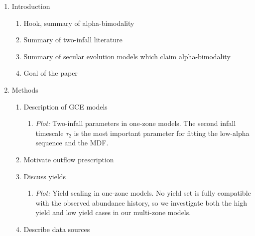 \begin{enumerate}

    \item Introduction
    \begin{enumerate}
        \item Hook, summary of alpha-bimodality
        \item Summary of two-infall literature
        \item Summary of secular evolution models which claim alpha-bimodality
        \item Goal of the paper
    \end{enumerate}
    
    \item Methods
    \begin{enumerate}
        \item Description of GCE models
        \begin{enumerate}
            \item {\it Plot:} Two-infall parameters in one-zone models. The second infall timescale $\tau_2$ is the most important parameter for fitting the low-alpha sequence and the MDF.
        \end{enumerate}
        \item Motivate outflow prescription
        \item Discuss yields
        \begin{enumerate}
            \item {\it Plot:} Yield scaling in one-zone models. No yield set is fully compatible with the observed abundance history, so we investigate both the high yield and low yield cases in our multi-zone models.
        \end{enumerate}
        \item Describe data sources
    \end{enumerate}
    

\end{enumerate}
